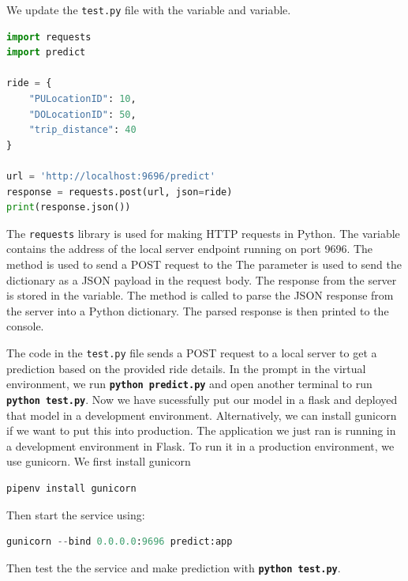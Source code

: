 \documentclass[letterpaper,12pt,notitlepage,twoside]{report}
\begin{document}
We update the \texttt{test.py} file with the \textbf{} variable and \textbf{} variable.
\begin{lstlisting}[language=python, numbers=none]
import requests
import predict

ride = {
    "PULocationID": 10,
    "DOLocationID": 50,
    "trip_distance": 40
}

url = 'http://localhost:9696/predict'
response = requests.post(url, json=ride)
print(response.json())
\end{lstlisting}

The \texttt{requests} library is used for making HTTP requests in Python. The \textbf{} variable contains the address of the local server endpoint \textbf{} running on port 9696. The \textbf{} method is used to send a POST request to the \textbf{} The \textbf{} parameter is used to send the \textbf{} dictionary as a JSON payload in the request body. The response from the server is stored in the \textbf{} variable. The \textbf{} method is called to parse the JSON response from the server into a Python dictionary. The parsed response is then printed to the console.

The code in the \texttt{test.py} file sends a POST request to a local server to get a prediction based on the provided ride details. In the prompt in the virtual environment, we run \textbf{\texttt{python predict.py}} and open another terminal to run \textbf{\texttt{python test.py}}.  Now we have sucessfully put our model in a flask and deployed that model in a development environment. Alternatively, we can install gunicorn if we want to put this into production. The application we just ran is running in a development environment in Flask. To run it in a production environment, we use gunicorn.  We first install gunicorn

\begin{lstlisting}[language=python, numbers=none]
pipenv install gunicorn
\end{lstlisting}

Then start the service using:
\begin{lstlisting}[language=python, numbers=none]
gunicorn --bind 0.0.0.0:9696 predict:app 
\end{lstlisting}
Then test the the service and make prediction with \textbf{\texttt{python test.py}}.
\end{document}
